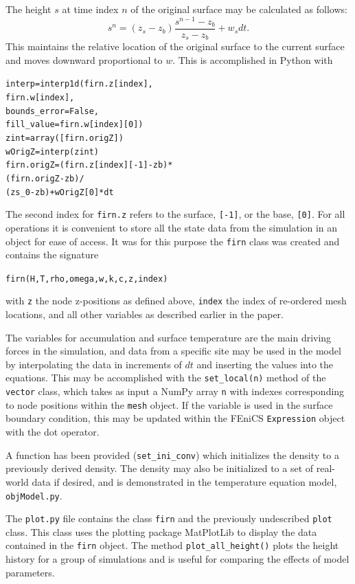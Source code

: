 \documentclass{article}%
\begin{document}
The height $s$ at time index $n$ of the original surface may be calculated as follows:
  $$s^{n} = (z_s - z_b) \frac{s^{n-1} - z_b}{z_{s} - z_b} + w_s dt.$$
This maintains the relative location of the original surface to the current surface and moves downward proportional to $w$.  This is accomplished in Python with\par
\footnotesize
\begin{alltt}
interp     = interp1d(firn.z[index], 
                      firn.w[index],
                      bounds_error=False,
                      fill_value=firn.w[index][0])
zint       = array([firn.origZ])
wOrigZ     = interp(zint)
firn.origZ = (firn.z[index][-1] - zb) * 
             (firn.origZ - zb) / 
             (zs_0 - zb) + wOrigZ[0] * dt
\end{alltt}
\normalsize
The second index for \texttt{firn.z} refers to the surface, \texttt{[-1]}, or the base, \texttt{[0]}.
For all operations it is convenient to store all the state data from the simulation in an object for ease of access.  It was for this purpose the \texttt{firn} class was created and contains the signature\par 
\footnotesize
\begin{alltt}
firn(H, T, rho, omega, w, k, c, z, index)
\end{alltt}
\normalsize
with \texttt{z} the node z-positions as defined above, \texttt{index} the index of re-ordered mesh locations, and all other variables as described earlier in the paper.

The variables for accumulation and surface temperature are the main driving forces in the simulation, and data from a specific site may be used in the model by interpolating the data in increments of $dt$ and inserting the values into the equations.  This may be accomplished with the \texttt{set\_local(n)} method of the \texttt{vector} class, which takes as input a NumPy array \texttt{n} with indexes corresponding to node positions within the \texttt{mesh} object.  If the variable is used in the surface boundary condition, this may be updated within the FEniCS \texttt{Expression} object with the dot operator.

A function has been provided (\texttt{set\_ini\_conv}) which initializes the density to a previously derived density.  The density may also be initialized to a set of real-world data if desired, and is demonstrated in the temperature equation model, \texttt{objModel.py}.

The \texttt{plot.py} file contains the class \texttt{firn} and the previously undescribed \texttt{plot} class.  This class uses the plotting package MatPlotLib to display the data contained in the \texttt{firn} object.  The method \texttt{plot\_all\_height()} plots the height history for a group of simulations and is useful for comparing the effects of model parameters. 
\end{document}
